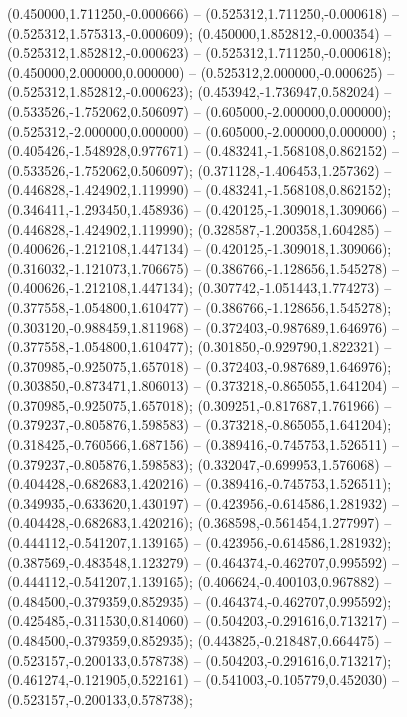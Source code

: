  (0.450000,1.711250,-0.000666) -- (0.525312,1.711250,-0.000618) -- (0.525312,1.575313,-0.000609);
 (0.450000,1.852812,-0.000354) -- (0.525312,1.852812,-0.000623) -- (0.525312,1.711250,-0.000618);
 (0.450000,2.000000,0.000000) -- (0.525312,2.000000,-0.000625) -- (0.525312,1.852812,-0.000623);
 (0.453942,-1.736947,0.582024) -- (0.533526,-1.752062,0.506097) -- (0.605000,-2.000000,0.000000);
 (0.525312,-2.000000,0.000000) -- (0.605000,-2.000000,0.000000) ;
 (0.405426,-1.548928,0.977671) -- (0.483241,-1.568108,0.862152) -- (0.533526,-1.752062,0.506097);
 (0.371128,-1.406453,1.257362) -- (0.446828,-1.424902,1.119990) -- (0.483241,-1.568108,0.862152);
 (0.346411,-1.293450,1.458936) -- (0.420125,-1.309018,1.309066) -- (0.446828,-1.424902,1.119990);
 (0.328587,-1.200358,1.604285) -- (0.400626,-1.212108,1.447134) -- (0.420125,-1.309018,1.309066);
 (0.316032,-1.121073,1.706675) -- (0.386766,-1.128656,1.545278) -- (0.400626,-1.212108,1.447134);
 (0.307742,-1.051443,1.774273) -- (0.377558,-1.054800,1.610477) -- (0.386766,-1.128656,1.545278);
 (0.303120,-0.988459,1.811968) -- (0.372403,-0.987689,1.646976) -- (0.377558,-1.054800,1.610477);
 (0.301850,-0.929790,1.822321) -- (0.370985,-0.925075,1.657018) -- (0.372403,-0.987689,1.646976);
 (0.303850,-0.873471,1.806013) -- (0.373218,-0.865055,1.641204) -- (0.370985,-0.925075,1.657018);
 (0.309251,-0.817687,1.761966) -- (0.379237,-0.805876,1.598583) -- (0.373218,-0.865055,1.641204);
 (0.318425,-0.760566,1.687156) -- (0.389416,-0.745753,1.526511) -- (0.379237,-0.805876,1.598583);
 (0.332047,-0.699953,1.576068) -- (0.404428,-0.682683,1.420216) -- (0.389416,-0.745753,1.526511);
 (0.349935,-0.633620,1.430197) -- (0.423956,-0.614586,1.281932) -- (0.404428,-0.682683,1.420216);
 (0.368598,-0.561454,1.277997) -- (0.444112,-0.541207,1.139165) -- (0.423956,-0.614586,1.281932);
 (0.387569,-0.483548,1.123279) -- (0.464374,-0.462707,0.995592) -- (0.444112,-0.541207,1.139165);
 (0.406624,-0.400103,0.967882) -- (0.484500,-0.379359,0.852935) -- (0.464374,-0.462707,0.995592);
 (0.425485,-0.311530,0.814060) -- (0.504203,-0.291616,0.713217) -- (0.484500,-0.379359,0.852935);
 (0.443825,-0.218487,0.664475) -- (0.523157,-0.200133,0.578738) -- (0.504203,-0.291616,0.713217);
 (0.461274,-0.121905,0.522161) -- (0.541003,-0.105779,0.452030) -- (0.523157,-0.200133,0.578738);
